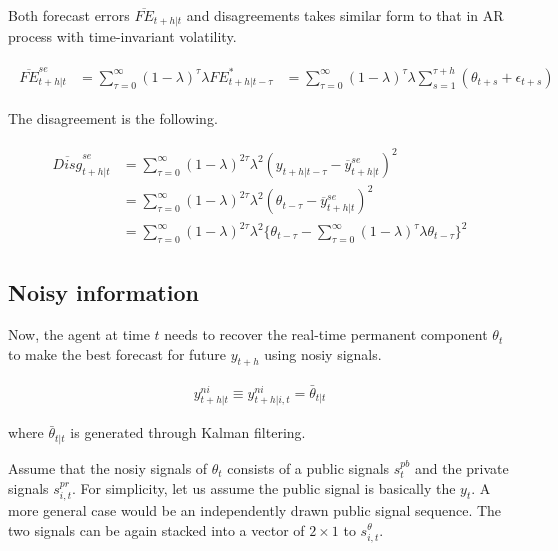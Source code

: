 \documentclass[]{article}
\begin{document}
Both forecast errors $\overline{FE}_{t+h|t}$ and disagreements takes similar form to that in AR process with time-invariant volatility. 


\begin{eqnarray}
\begin{split}
\overline {FE}^{se}_{t+h|t} & = \sum^{\infty}_{\tau=0} (1-\lambda)^\tau\lambda {FE}^*_{t+h|t-\tau} 
& = \sum^{\infty}_{\tau=0} (1-\lambda)^\tau\lambda \sum^{\tau+h}_{s=1} (\theta_{t+s} + \epsilon_{t+s})  
\end{split} 
\end{eqnarray}

The disagreement is the following. 


\begin{eqnarray}
\begin{split}
\overline{Disg}^{se}_{t+h|t} & =  \sum^{\infty}_{\tau=0} (1-\lambda)^{2\tau} \lambda^2 (y_{t+h|t-\tau} - \overline y^{se}_{t+h|t})^2  \\
& = \sum^{\infty}_{\tau=0} (1-\lambda)^{2\tau} \lambda^2 (\theta_{t-\tau} - \overline y^{se}_{t+h|t})^2  \\
& = \sum^{\infty}_{\tau=0} (1-\lambda)^{2\tau} \lambda^2 \{\theta_{t-\tau} - \sum^{\infty}_{\tau=0} (1-\lambda)^\tau\lambda \theta_{t-\tau}\}^2  
\end{split} 
\end{eqnarray}

\subsection{Noisy information}


Now, the agent at time $t$ needs to recover the real-time permanent component $\theta_t$ to make the best forecast for future $y_{t+h}$ using nosiy signals.   


\begin{eqnarray}
y^{ni}_{t+h|t}  \equiv  y^{ni}_{t+h|i,t} = \bar \theta_{t|t}
\end{eqnarray}

where $\bar \theta_{t|t}$ is generated through Kalman filtering.  

Assume that the nosiy signals of $\theta_t$ consists of a public signals $s^{pb}_{t}$ and the private signals $s^{pr}_{i,t}$. For simplicity, let us assume the public signal is basically the $y_t$. A more general case would be an independently drawn public signal sequence. The two signals can be again stacked into a vector of $2\times 1$ to $s^\theta_{i,t}$. 
\end{document}
